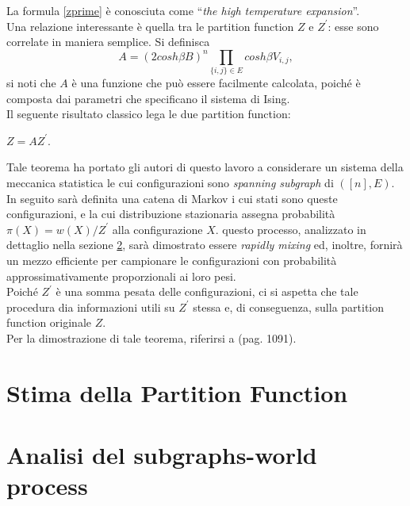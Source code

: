 La formula \ref{zprime} è conosciuta come ``\textit{the high temperature expansion}''.\\
Una relazione interessante è quella tra le partition function $Z$ e $Z^\prime$: esse sono correlate in maniera semplice. Si definisca
\begin{equation}
	A = (2cosh\beta B)^{n} \prod_{\{i,j\}\in E}{cosh\beta V_{i,j}},
	\label{funca}
\end{equation}
si noti che $A$ è una funzione che può essere facilmente calcolata, poiché è composta dai parametri che specificano il sistema di Ising.\\
Il seguente risultato classico \cite{newell1953theory} lega le due partition function:
\begin{thm}
	$Z = AZ^\prime$.
\end{thm}
Tale teorema ha portato gli autori di questo lavoro a considerare un sistema della meccanica statistica le cui configurazioni sono \textit{spanning subgraph} di $([n], E)$. In seguito sarà definita una catena di Markov i cui stati sono queste configurazioni, e la cui distribuzione stazionaria assegna probabilità $\pi(X) = w(X)/Z^\prime$ alla configurazione $X$. questo processo, analizzato in dettaglio nella sezione \ref{sec:swp}, sarà dimostrato essere \textit{rapidly mixing} ed, inoltre, fornirà un mezzo efficiente per campionare le configurazioni con probabilità approssimativamente proporzionali ai loro pesi.\\
Poiché $Z^\prime$ è una somma pesata delle configurazioni, ci si aspetta che tale procedura dia informazioni utili su $Z^\prime$ stessa e, di conseguenza, sulla partition function originale $Z$.\\
Per la dimostrazione di tale teorema, riferirsi a \cite{jerrum1993polynomial} (pag. 1091).
\section{Stima della Partition Function}

\section{Analisi del subgraphs-world process} \label{sec:swp}